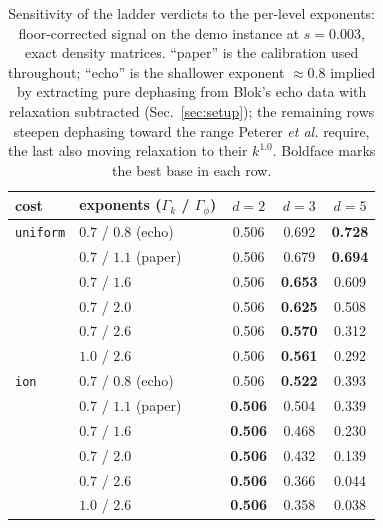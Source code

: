 \documentclass[aps,pra,reprint,superscriptaddress,nofootinbib,floatfix]{revtex4-2}
\begin{document}
\begin{table}[t]
\caption{Sensitivity of the ladder verdicts to the per-level
exponents: floor-corrected signal on the demo instance at $s=0.003$,
exact density matrices. ``paper'' is the calibration used throughout;
``echo'' is the shallower exponent ${\approx}0.8$ implied by
extracting pure dephasing from Blok's echo data with relaxation
subtracted (Sec.~\ref{sec:setup}); the remaining rows steepen
dephasing toward the range Peterer
\emph{et al.} require, the last also moving relaxation to their
$k^{1.0}$. Boldface marks the best base in each row.}
\label{tab:exponent}
\begin{ruledtabular}
\begin{tabular}{llccc}
cost & exponents ($\Gamma_k$ / $\Gamma_\phi$) & $d{=}2$ & $d{=}3$ & $d{=}5$ \\
\hline
\texttt{uniform} & $0.7$ / $0.8$ (echo)  & 0.506 & 0.692 & \textbf{0.728} \\
                 & $0.7$ / $1.1$ (paper) & 0.506 & 0.679 & \textbf{0.694} \\
                 & $0.7$ / $1.6$         & 0.506 & \textbf{0.653} & 0.609 \\
                 & $0.7$ / $2.0$         & 0.506 & \textbf{0.625} & 0.508 \\
                 & $0.7$ / $2.6$         & 0.506 & \textbf{0.570} & 0.312 \\
                 & $1.0$ / $2.6$         & 0.506 & \textbf{0.561} & 0.292 \\
\hline
\texttt{ion}     & $0.7$ / $0.8$ (echo)  & 0.506 & \textbf{0.522} & 0.393 \\
                 & $0.7$ / $1.1$ (paper) & \textbf{0.506} & 0.504 & 0.339 \\
                 & $0.7$ / $1.6$         & \textbf{0.506} & 0.468 & 0.230 \\
                 & $0.7$ / $2.0$         & \textbf{0.506} & 0.432 & 0.139 \\
                 & $0.7$ / $2.6$         & \textbf{0.506} & 0.366 & 0.044 \\
                 & $1.0$ / $2.6$         & \textbf{0.506} & 0.358 & 0.038 \\
\end{tabular}
\end{ruledtabular}
\end{table}
\end{document}
